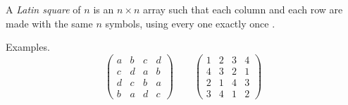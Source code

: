 \documentclass[12pt]{article}
\begin{document}
A \emph{Latin square} of $n$ is an $n\times n$ array such that each column and each row are made with the same $n$ symbols, using every one exactly once .

Examples.
\begin{equation*}
\left(\begin{array}{cccc}
a & b & c & d\\
c & d & a &b\\
d & c & b & a\\
b & a & d & c
\end{array}\right)
\qquad
\left(\begin{array}{cccc}
1 & 2&  3&  4\\
4 & 3 & 2 & 1\\
2 & 1 & 4 & 3\\
3 & 4 & 1 & 2
\end{array}\right)
\end{equation*}
\end{document}
